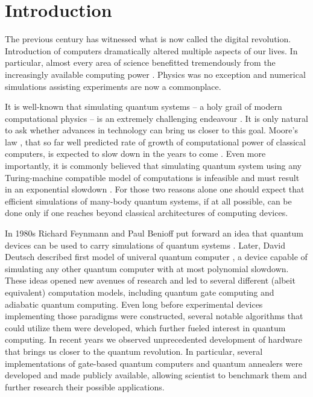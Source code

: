 \chapter*{Introduction}
The previous century has witnessed what is now called the digital revolution. Introduction of computers dramatically altered multiple aspects of our lives. In particular, almost every area of science benefitted tremendously from the increasingly available computing power \cite{winsberg}. Physics was no exception and numerical simulations assisting experiments are now a commonplace.

It is well-known that simulating quantum systems -- a holy grail of modern computational physics -- is an extremely challenging endeavour \cite{feynman.82}. It is only natural to ask whether advances in technology can bring us closer to this goal.  Moore's law \cite{mack}, that so far well predicted rate of growth of computational power of classical computers, is expected to slow down in the years to come \cite{waldrop, kumar}. Even more importantly, it is commonly believed that simulating quantum system using any Turing-machine compatible model of computations is infeasible and must result in an exponential slowdown \cite{feynman.82, poplavskii}. For those two reasons alone one should expect that efficient simulations of many-body quantum systems, if at all possible, can be done only if one reaches beyond classical architectures of computing devices.

In 1980s Richard Feynmann and Paul Benioff put forward an idea that quantum devices can be used to carry simulations of quantum systems \cite{feynman.82,benioff.80}. Later,  David Deutsch described first model of univeral quantum computer \cite{deutsch}, a device capable of simulating any other quantum computer with at most polynomial slowdown. These ideas opened new avenues of research and led to several different (albeit equivalent) computation models, including quantum gate computing and adiabatic quantum computing. Even long before experimental devices implementing those paradigms were constructed, several notable algorithms that could utilize them were developed, which further fueled interest in quantum computing. In recent years we observed unprecedented development of hardware that brings us closer to the quantum revolution. In particular, several implementations of gate-based quantum computers and quantum annealers were developed and made publicly available, allowing scientist to benchmark them and further research their possible applications.

